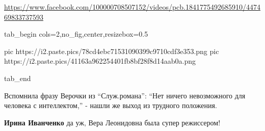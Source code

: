  
 
 
 
 

\url{https://www.facebook.com/100000708507152/videos/pcb.1841775492685910/447469833737593}


\ifcmt
  tab_begin cols=2,no_fig,center,resizebox=0.5

     pic https://i2.paste.pics/78cd4ebc71531090399c9710cdf3e353.png
		 pic https://i2.paste.pics/41163a962254401fb8bf28f8d14aab0a.png

  tab_end
\fi


Вспомнила фразу Верочки из \enquote{Служ.романа}: \enquote{Нет ничего невозможного для
человека с интеллектом,} - нашли же выход из трудного положения.

\textbf{Ирина Иванченко} да уж, Вера Леонидовна была супер режиссером!
